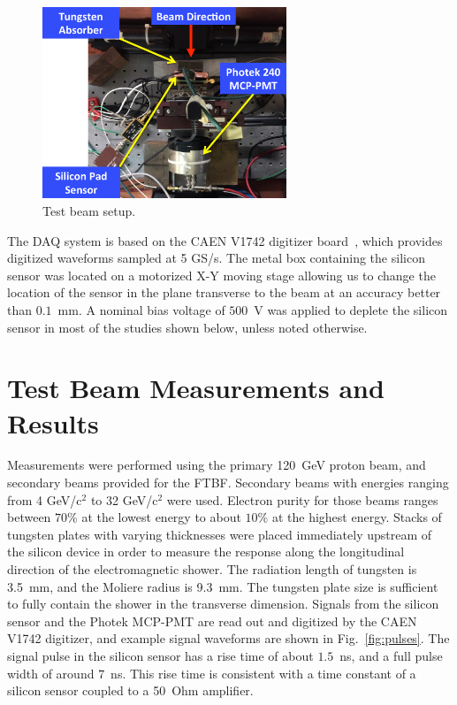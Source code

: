 \documentclass[12pt]{article}
\begin{document}
{\begin{figure}[htbp] 
\centering
\includegraphics[width=0.65\textwidth]{plots/BeamPhotoDiagram.pdf} 
\caption{Test beam setup.} 
\label{fig:BeamPhotoDiagram} 
\end{figure} 

The DAQ system is based on the CAEN V1742 digitizer board~\cite{CAENDRS}, which
provides digitized waveforms sampled at 5 GS/s. The metal box containing the
silicon sensor was located on a motorized X-Y moving stage allowing us to change
the location of the sensor in the plane transverse to the beam at an accuracy
better than $0.1$~mm. A nominal bias voltage of $500$~V was applied to deplete
the silicon sensor in most of the studies shown below, unless noted otherwise.


\section{Test Beam Measurements and Results} 
\label{sec:results} 

Measurements were performed using the primary 120~GeV proton beam, and secondary
beams provided for the FTBF. Secondary beams with energies ranging from 4
GeV/c$^2$ to 32 GeV/c$^2$ were used. Electron purity for those beams ranges
between $70\%$ at the lowest energy to about $10\%$ at the highest energy.
Stacks of tungsten plates with varying thicknesses were placed immediately
upstream of the silicon device in order to measure the response along the
longitudinal direction of the electromagnetic shower. The radiation length of
tungsten is 3.5~mm, and the Moliere radius is 9.3~mm. The tungsten plate size is
sufficient to fully contain the shower in the transverse dimension. Signals from
the silicon sensor and the Photek MCP-PMT are read out and digitized by the CAEN
V1742 digitizer, and example signal waveforms are shown in
Fig.~\ref{fig:pulses}. The signal pulse in the silicon sensor has a rise time of
about $1.5$~ns, and a full pulse width of around $7$~ns. This rise time is
consistent with a time constant of a silicon sensor coupled to a 50~Ohm amplifier.

}
\end{document}
